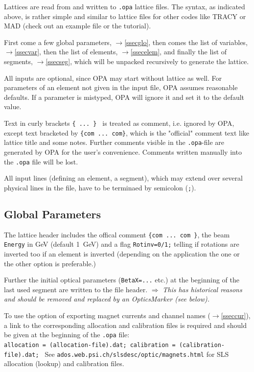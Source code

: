\documentclass[12pt]{article}
\newcommand{\see}{\mbox{$\rightarrow$}}
\newcommand\todo[1]{$\Longrightarrow$ {\em #1} }
\begin{document}
Lattices are read from and written to {\tt *.opa} lattice files. The syntax, as indicated above, is rather simple and similar to lattice files for other codes like TRACY or MAD (check out an example file or the tutorial).

First come a few global parameters, \see\ref{ssecglo},
then comes the list of variables, \see\ref{ssecvar}, then the list of elements, \see\ref{ssecelem}, and finally the list of segments, \see\ref{ssecseg}, which will
be unpacked recursively to generate the lattice.

All inputs are optional, since OPA may start without lattice as well.
For parameters of an element not given in the input file, OPA assumes reasonable defaults.
If a parameter is mistyped, OPA will ignore it and set it to the default value.

Text in curly brackets { \tt \{ ... \} } is treated as comment,
i.e. ignored by OPA, except text bracketed by {\tt \{com ... com\}},
which is the "official" comment text like lattice title and some notes.
Further comments visible in the {\tt *.opa}-file are generated by OPA
for the user's convenience. Comments written manually into
the {\tt *.opa} file will be lost.

All input lines (defining an element, a segment), which may extend over several physical lines in the file, have to be terminaed by semicolon ({\tt ;}).

\subsection{\label{ssecglo}Global Parameters}
The lattice header includes the offical comment {\tt \{com ... com \}},
the beam {\tt Energy} in GeV (default 1~GeV) and a flag {\tt Rotinv=0/1;} telling if rotations are inverted too if an element is inverted (depending on the application the one or the other option is preferable.)

Further the initial optical parameters ({\tt BetaX=...} etc.) at the beginning of the last used segment are written to the file header.
\todo{This has historical reasons and should be removed and replaced by an OpticsMarker (see below).}

To use the option of exporting magnet currents and channel names (\see\ref{sseccur}), a
link to the corresponding allocation and calibration files is required
and should be given at the beginning of the {\tt *.opa} file:\\
{\tt allocation  = (allocation-file).dat; calibration = (calibration-file).dat; }
See {\tt ados.web.psi.ch/slsdesc/optic/magnets.html} for SLS allocation (lookup) and calibration files.
\end{document}
